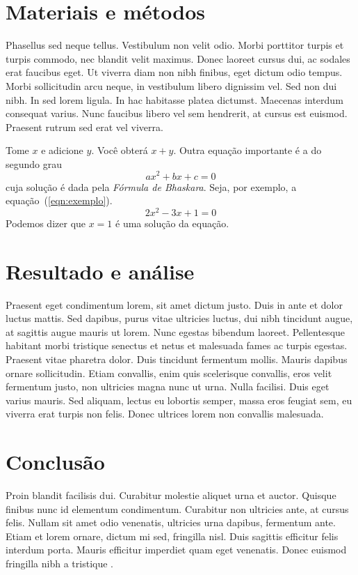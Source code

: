 \documentclass{article}
\begin{document}
	\section{Materiais e métodos}
	
	Phasellus sed neque tellus. Vestibulum non velit odio. Morbi porttitor turpis et turpis commodo, nec blandit velit maximus. Donec laoreet cursus dui, ac sodales erat faucibus eget. Ut viverra diam non nibh finibus, eget dictum odio tempus. Morbi sollicitudin arcu neque, in vestibulum libero dignissim vel. Sed non dui nibh. In sed lorem ligula. In hac habitasse platea dictumst. Maecenas interdum consequat varius. Nunc faucibus libero vel sem hendrerit, at cursus est euismod. Praesent rutrum sed erat vel viverra. 
	
	
	Tome $x$ e adicione $y$. Você obterá $x+y$.
	Outra equação importante é a do segundo grau
	\[ax^2+bx+c=0\] cuja solução é dada pela
	\emph{Fórmula de Bhaskara}.
	Seja, por exemplo, a equação~(\ref{eqn:exemplo}).
	\begin{equation}
		2x^2-3x+1=0
		\label{eqn:exemplo}
	\end{equation}
	Podemos dizer que $x=1$ é uma solução da equação.
	
	\section{Resultado e análise}
	
	Praesent eget condimentum lorem, sit amet dictum justo. Duis in ante et dolor luctus mattis. Sed dapibus, purus vitae ultricies luctus, dui nibh tincidunt augue, at sagittis augue mauris ut lorem. Nunc egestas bibendum laoreet. Pellentesque habitant morbi tristique senectus et netus et malesuada fames ac turpis egestas. Praesent vitae pharetra dolor. Duis tincidunt fermentum mollis. Mauris dapibus ornare sollicitudin. Etiam convallis, enim quis scelerisque convallis, eros velit fermentum justo, non ultricies magna nunc ut urna. Nulla facilisi. Duis eget varius mauris. Sed aliquam, lectus eu lobortis semper, massa eros feugiat sem, eu viverra erat turpis non felis. Donec ultrices lorem non convallis malesuada.
	
	
	\section{Conclusão}
	
	Proin blandit facilisis dui. Curabitur molestie aliquet urna et auctor. Quisque finibus nunc id elementum condimentum. Curabitur non ultricies ante, at cursus felis. Nullam sit amet odio venenatis, ultricies urna dapibus, fermentum ante. Etiam et lorem ornare, dictum mi sed, fringilla nisl. Duis sagittis efficitur felis interdum porta. Mauris efficitur imperdiet quam eget venenatis. Donec euismod fringilla nibh a tristique \cite{Biddinger2015}.
	
\end{document}
